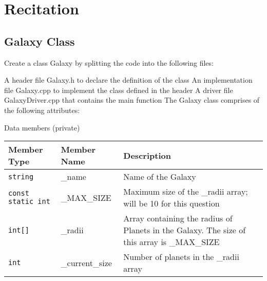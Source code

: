 \section{Recitation}



\subsection{Galaxy Class}
Create a class Galaxy by splitting the code into the following files:

A header file Galaxy.h to declare the definition of the class
An implementation file Galaxy.cpp to implement the class defined in the header
A driver file GalaxyDriver.cpp that contains the main function
The Galaxy class comprises of the following attributes:

Data members (private)

\begin{table}[H]
    \centering
    \begin{tabular}{p{1.5in}|p{1.5in}|p{3in}}
        \textbf{Member Type} & \textbf{Member Name} & \textbf{Description} \\ \hline
        \texttt{string} & \_name & Name of the Galaxy \\
        \texttt{const static int} & \_MAX\_SIZE & Maximum size of the \_radii array; will be 10 for this question \\
        \texttt{int[]} & \_radii & Array containing the radius of Planets in the Galaxy. The size of this array is \_MAX\_SIZE \\
        \texttt{int} & \_current\_size & Number of planets in the \_radii array \\
    \end{tabular}
\end{table}

